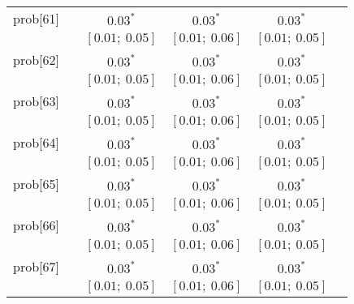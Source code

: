 \begin{table}
\begin{center}
\begin{tabular}{l c c c c c }
prob[61]    &                                  & $0.03^{*}$                & $0.03^{*}$                & $0.03^{*}$              &                         \\
            &                                  & $[0.01;\ 0.05]$           & $[0.01;\ 0.06]$           & $[0.01;\ 0.05]$         &                         \\
prob[62]    &                                  & $0.03^{*}$                & $0.03^{*}$                & $0.03^{*}$              &                         \\
            &                                  & $[0.01;\ 0.05]$           & $[0.01;\ 0.06]$           & $[0.01;\ 0.05]$         &                         \\
prob[63]    &                                  & $0.03^{*}$                & $0.03^{*}$                & $0.03^{*}$              &                         \\
            &                                  & $[0.01;\ 0.05]$           & $[0.01;\ 0.06]$           & $[0.01;\ 0.05]$         &                         \\
prob[64]    &                                  & $0.03^{*}$                & $0.03^{*}$                & $0.03^{*}$              &                         \\
            &                                  & $[0.01;\ 0.05]$           & $[0.01;\ 0.06]$           & $[0.01;\ 0.05]$         &                         \\
prob[65]    &                                  & $0.03^{*}$                & $0.03^{*}$                & $0.03^{*}$              &                         \\
            &                                  & $[0.01;\ 0.05]$           & $[0.01;\ 0.06]$           & $[0.01;\ 0.05]$         &                         \\
prob[66]    &                                  & $0.03^{*}$                & $0.03^{*}$                & $0.03^{*}$              &                         \\
            &                                  & $[0.01;\ 0.05]$           & $[0.01;\ 0.06]$           & $[0.01;\ 0.05]$         &                         \\
prob[67]    &                                  & $0.03^{*}$                & $0.03^{*}$                & $0.03^{*}$              &                         \\
            &                                  & $[0.01;\ 0.05]$           & $[0.01;\ 0.06]$           & $[0.01;\ 0.05]$         &                         \\

\end{tabular}
\end{center}
\end{table}
